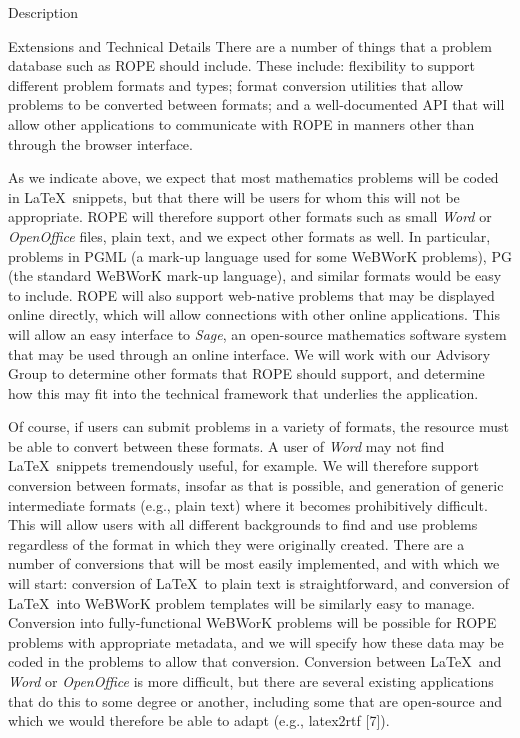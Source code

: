 \documentclass[11pt]{article}
\begin{document}
\begin{section}{Description}
\begin{subsection}{Extensions and Technical Details}
There are a number of things that a problem database such as ROPE should
include.  These include: flexibility to support different problem formats
and types; format conversion utilities that allow problems to be converted
between formats; and a well-documented API that will allow other
applications to communicate with ROPE in manners other than through the
browser interface.

As we indicate above, we expect that most mathematics problems will be
coded in \LaTeX\ snippets, but that there will be users for whom this will
not be appropriate.  ROPE will therefore support other formats such as
small \emph{Word} or \emph{OpenOffice} files, plain text, and we expect
other formats as well.  In particular, problems in PGML (a mark-up
language used for some WeBWorK problems), PG (the standard WeBWorK mark-up
language), and similar formats would be easy to include.  ROPE will also
support web-native problems that may be displayed online
directly, which will allow connections with other online applications.
This will allow an easy interface to \emph{Sage}, an open-source
mathematics software system that may be used through an online interface.  We
will work with our Advisory Group to determine other formats that ROPE
should support, and determine how this may fit into the technical
framework that underlies the application.

Of course, if users can submit problems in a variety of formats, the resource 
must be able to convert between these formats.
A user of
\emph{Word} may not find \LaTeX\ snippets tremendously useful, for
example.  We will therefore support conversion between formats, insofar as
that is possible, and generation of generic intermediate formats (e.g.,
plain text) where it becomes prohibitively difficult.  This will allow
users with all different backgrounds to find and use problems regardless
of the format in which they were originally created.  There are a number
of conversions that will be most easily implemented, and with which we
will start: conversion of \LaTeX\ to plain text is straightforward, and
conversion of \LaTeX\ into WeBWorK problem templates will be similarly
easy to manage.  Conversion into fully-functional WeBWorK problems will
be possible for ROPE problems with appropriate metadata, and we will
specify how these data may be coded in the problems to allow that
conversion.  Conversion between \LaTeX\ and \emph{Word} or
\emph{OpenOffice} is more difficult, but there are several existing
applications that do this to some degree or another, including some that
are open-source and which we would therefore be able to adapt (e.g.,
latex2rtf [7]).  


\end{subsection}
\end{section}
\end{document}
